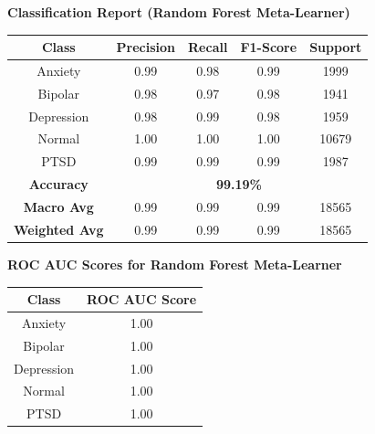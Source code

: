 \pagebreak

\begin{center}
    \textbf{Classification Report (Random Forest Meta-Learner)} \\[0.5em]
    \begin{tabular}{|c|c|c|c|c|}
        \hline
        \textbf{Class} & \textbf{Precision} & \textbf{Recall} & \textbf{F1-Score} & \textbf{Support} \\ \hline
        Anxiety & 0.99 & 0.98 & 0.99 & 1999 \\ \hline
        Bipolar & 0.98 & 0.97 & 0.98 & 1941 \\ \hline
        Depression & 0.98 & 0.99 & 0.98 & 1959 \\ \hline
        Normal & 1.00 & 1.00 & 1.00 & 10679 \\ \hline
        PTSD & 0.99 & 0.99 & 0.99 & 1987 \\ \hline
        \textbf{Accuracy} & \multicolumn{4}{c|}{\textbf{99.19\%}} \\ \hline
        \textbf{Macro Avg} & 0.99 & 0.99 & 0.99 & 18565 \\ \hline
        \textbf{Weighted Avg} & 0.99 & 0.99 & 0.99 & 18565 \\ \hline
    \end{tabular}
\end{center}

\begin{center}
    \textbf{ROC AUC Scores for Random Forest Meta-Learner} \\[0.5em]
    \begin{tabular}{|c|c|}
        \hline
        \textbf{Class} & \textbf{ROC AUC Score} \\ \hline
        Anxiety & 1.00 \\ \hline
        Bipolar & 1.00 \\ \hline
        Depression & 1.00 \\ \hline
        Normal & 1.00 \\ \hline
        PTSD & 1.00 \\ \hline
    \end{tabular}
\end{center}


